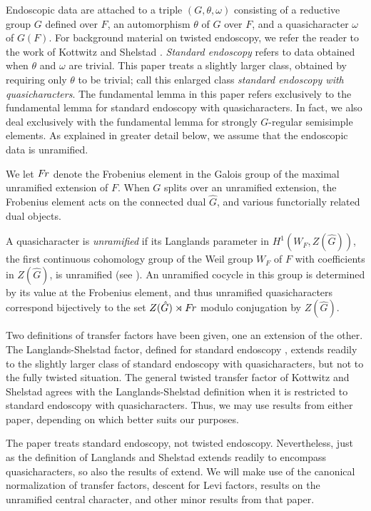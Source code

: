 \documentclass{amsart}
\newcommand\Fr{\text{$F\hskip-.1em r$}}
\begin{document}
Endoscopic data are attached to a triple $(G,\theta,\omega)$
consisting of a reductive group $G$ defined over $F$, 
an automorphism $\theta$  of $G$ over $F$, and a quasicharacter
$\omega$
of $G(F)$.  For background material on twisted endoscopy, we refer
the reader to the work of
Kottwitz and Shelstad \cite{KS1}.
{\it Standard endoscopy}
refers to data obtained when $\theta$ and $\omega$ are trivial.
This paper treats a slightly larger class, obtained by
requiring only $\theta$ to be trivial; call this
enlarged class {\it standard endoscopy with quasicharacters}.
The fundamental lemma in this paper refers exclusively
to the fundamental lemma for standard endoscopy with 
quasicharacters.  In fact, we also deal exclusively with
the fundamental lemma for strongly $G$-regular semisimple
elements.  As explained in greater detail below, we assume that
the endoscopic data is unramified.  

We let $\Fr$ denote the Frobenius element in the Galois group of the maximal
unramified extension of $F$.  When $G$ splits over an unramified extension,
the Frobenius element acts on the connected dual $\hat G$, and various
functorially related dual objects.  

A quasicharacter is {\it unramified} if its Langlands
parameter in $H^1(W_F,Z(\hat G))$,
the first continuous
cohomology group of the Weil group $W_F$ of $F$ with coefficients
in $Z(\hat G)$, 
is unramified (see \cite{B}).  An unramified cocycle in this group is
determined by its value at the Frobenius element, and
thus unramified quasicharacters correspond bijectively
to the set $Z(\hat G)\rtimes \Fr$ modulo conjugation by $Z(\hat G)$.

Two definitions of transfer factors have been given, one
an extension of the other.  The Langlands-Shelstad factor,
defined for standard endoscopy \cite{LS1}, extends
readily to the slightly larger class of standard endoscopy
with quasicharacters, but not to the fully twisted situation.
The general twisted transfer factor of Kottwitz and Shelstad
\cite{KS1} agrees with the Langlands-Shelstad definition
when it is restricted to standard endoscopy with quasicharacters.
Thus, we may use results from either paper, depending on
which better suits our purposes.

The paper \cite{H2} treats standard endoscopy, not
twisted endoscopy.  Nevertheless, just as the definition
of Langlands and Shelstad extends readily to encompass
quasicharacters, so also the results of \cite{H2} extend.
We will make use of the canonical normalization of
transfer factors, descent for Levi factors, results
on the unramified central character, and other
minor results from that paper.
\end{document}
